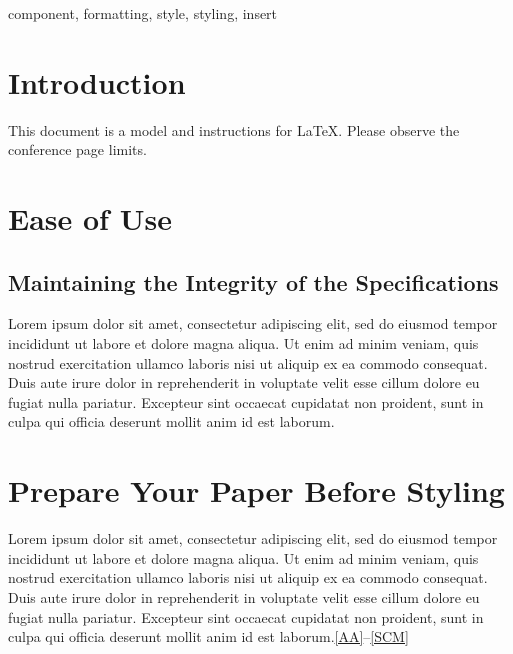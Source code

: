 \documentclass[conference]{IEEEtran}
\begin{document}
\begin{abstract}
    This document is a model and instructions for \LaTeX.
    Lorem ipsum dolor sit amet, consectetur adipiscing elit, sed do eiusmod 
    tempor incididunt ut labore et dolore magna aliqua. Ut enim ad minim 
    veniam, quis nostrud exercitation ullamco laboris nisi ut aliquip ex ea 
    commodo consequat. Duis aute irure dolor in reprehenderit in voluptate 
    velit esse cillum dolore eu fugiat nulla pariatur. Excepteur sint occaecat 
    cupidatat non proident, sunt in culpa qui officia deserunt mollit anim id 
    est laborum.
    
\end{abstract}

\begin{IEEEkeywords}
    component, formatting, style, styling, insert
\end{IEEEkeywords}

\section{Introduction}
    This document is a model and instructions for \LaTeX.
    Please observe the conference page limits. 
\section{Ease of Use}

\subsection{Maintaining the Integrity of the Specifications}
    Lorem ipsum dolor sit amet, consectetur adipiscing elit, sed do eiusmod 
    tempor incididunt ut labore et dolore magna aliqua. Ut enim ad minim 
    veniam, quis nostrud exercitation ullamco laboris nisi ut aliquip ex ea 
    commodo consequat. Duis aute irure dolor in reprehenderit in voluptate 
    velit esse cillum dolore eu fugiat nulla pariatur. Excepteur sint occaecat 
    cupidatat non proident, sunt in culpa qui officia deserunt mollit anim id 
    est laborum.
\section{Prepare Your Paper Before Styling}
    Lorem ipsum dolor sit amet, consectetur adipiscing elit, sed do eiusmod 
    tempor incididunt ut labore et dolore magna aliqua. Ut enim ad minim 
    veniam, quis nostrud exercitation ullamco laboris nisi ut aliquip ex ea 
    commodo consequat. Duis aute irure dolor in reprehenderit in voluptate 
    velit esse cillum dolore eu fugiat nulla pariatur. Excepteur sint occaecat 
    cupidatat non proident, sunt in culpa qui officia deserunt mollit anim id 
    est laborum.\ref{AA}--\ref{SCM} 
\end{document}
